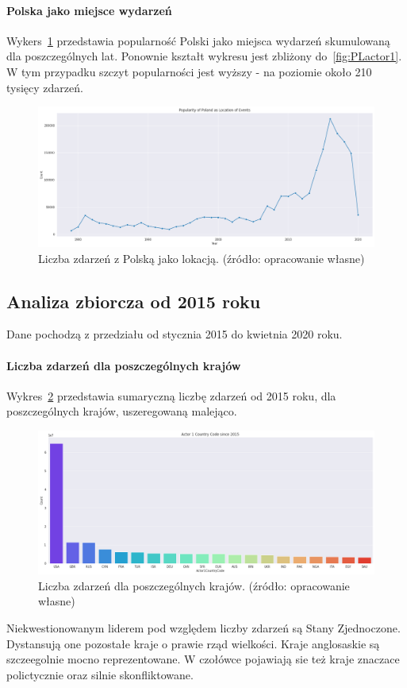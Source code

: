 \documentclass[11pt]{report}
\begin{document}
    \paragraph{Polska jako miejsce wydarzeń}
    Wykers~\ref{fig:PLlocation} przedstawia popularność Polski jako miejsca wydarzeń skumulowaną dla poszczególnych lat. Ponownie kształt wykresu jest zbliżony do~\ref{fig:PLactor1}. W tym przypadku szczyt popularności jest wyższy - na poziomie około 210 tysięcy zdarzeń.
    \begin{figure}[ht!]
        \centering
        \includegraphics[width=1 \textwidth]{fig/PL/PLlocation.png}
        \caption{Liczba zdarzeń z Polską jako lokacją. (źródło: opracowanie własne)}
        \label{fig:PLlocation}
    \end{figure}

    \subsection{Analiza zbiorcza od 2015 roku}
    Dane pochodzą z przedziału od stycznia 2015 do kwietnia 2020 roku.

    \paragraph{Liczba zdarzeń dla poszczególnych krajów}
    Wykres~\ref{fig:GLOBALactor1} przedstawia sumaryczną liczbę zdarzeń od 2015 roku, dla poszczególnych krajów, uszeregowaną malejąco.
    \begin{figure}[ht!]
        \centering
        \includegraphics[width=1 \textwidth]{fig/GLOBAL/Actor1.png}
        \caption{Liczba zdarzeń dla poszczególnych krajów. (źródło: opracowanie własne)}
        \label{fig:GLOBALactor1}
    \end{figure}
    Niekwestionowanym liderem pod względem liczby zdarzeń są Stany Zjednoczone. Dystansują one pozostałe kraje o prawie rząd wielkości. Kraje anglosaskie są szczeegolnie mocno reprezentowane. W czołówce pojawiają sie też kraje znaczace polictycznie oraz silnie skonfliktowane.
\end{document}
